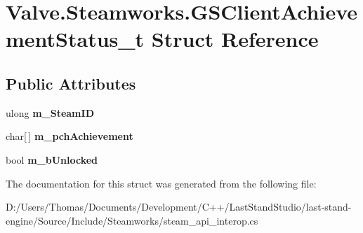 \hypertarget{structValve_1_1Steamworks_1_1GSClientAchievementStatus__t}{}\section{Valve.\+Steamworks.\+G\+S\+Client\+Achievement\+Status\+\_\+t Struct Reference}
\label{structValve_1_1Steamworks_1_1GSClientAchievementStatus__t}
\subsection*{Public Attributes}
\begin{DoxyCompactItemize}
\item 
\hypertarget{structValve_1_1Steamworks_1_1GSClientAchievementStatus__t_af32b235a06208c3653aedbffd0b9bcaf}{}ulong {\bfseries m\+\_\+\+Steam\+I\+D}\label{structValve_1_1Steamworks_1_1GSClientAchievementStatus__t_af32b235a06208c3653aedbffd0b9bcaf}

\item 
\hypertarget{structValve_1_1Steamworks_1_1GSClientAchievementStatus__t_a513a2bb62f4eee1c1407d939491651ae}{}char\mbox{[}$\,$\mbox{]} {\bfseries m\+\_\+pch\+Achievement}\label{structValve_1_1Steamworks_1_1GSClientAchievementStatus__t_a513a2bb62f4eee1c1407d939491651ae}

\item 
\hypertarget{structValve_1_1Steamworks_1_1GSClientAchievementStatus__t_a7d5dc53a9d6c0f3d848c635e00d8f33b}{}bool {\bfseries m\+\_\+b\+Unlocked}\label{structValve_1_1Steamworks_1_1GSClientAchievementStatus__t_a7d5dc53a9d6c0f3d848c635e00d8f33b}

\end{DoxyCompactItemize}


The documentation for this struct was generated from the following file\+:\begin{DoxyCompactItemize}
\item 
D\+:/\+Users/\+Thomas/\+Documents/\+Development/\+C++/\+Last\+Stand\+Studio/last-\/stand-\/engine/\+Source/\+Include/\+Steamworks/steam\+\_\+api\+\_\+interop.\+cs\end{DoxyCompactItemize}
